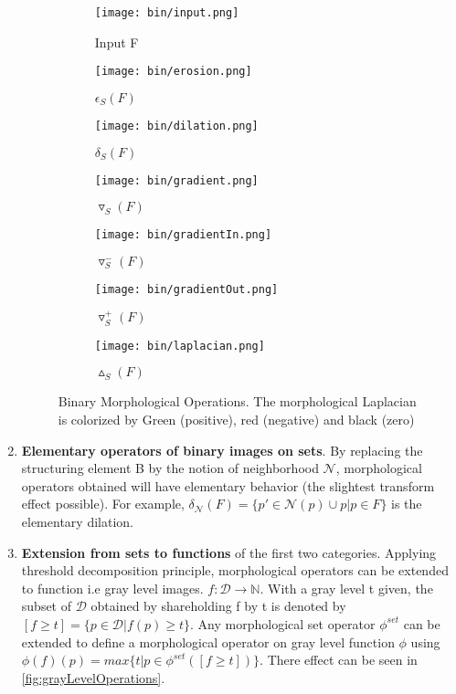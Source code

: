 \begin{enumerate}
\begin{figure}
	\begin{subfigure}{0.2\textwidth}
	 	\texttt{[image: bin/input.png]} \caption{Input F}\label{fig:inputbin} \end{subfigure}
	\begin{subfigure}{0.2\textwidth}
	 	\texttt{[image: bin/erosion.png]} \caption{$ \epsilon_S (F)$}\label{fig:erosionbin} \end{subfigure}
	\begin{subfigure}{0.2\textwidth}
		\texttt{[image: bin/dilation.png]} \caption{$ \delta_S (F)$}\label{fig:dilationbin} \end{subfigure}
	\centering
		
	\begin{subfigure}{0.2\textwidth}
		\texttt{[image: bin/gradient.png]} 
		\caption{$ \triangledown_S (F)$}\label{fig:gradientbin} \end{subfigure}
	\begin{subfigure}{0.2\textwidth}
		\texttt{[image: bin/gradientIn.png]} 
		\caption{$ \triangledown_S ^- (F)$}\label{fig:gradientInbin} \end{subfigure}		
	\begin{subfigure}{0.2\textwidth}	
		\texttt{[image: bin/gradientOut.png]} 
		\caption{$ \triangledown_S ^+ (F)$}\label{fig:gradientOutbin} \end{subfigure}
	\begin{subfigure}{0.2\textwidth}	
		\texttt{[image: bin/laplacian.png]} 
		\caption{$\vartriangle_S (F)$}\label{fig:laplacianbin} \end{subfigure}					
	\centering
	\caption[Example of \textit{morphological operations}] {Binary Morphological Operations. The morphological Laplacian is colorized by Green (positive), red (negative) and black (zero) }
	\label{fig:binOperations}
\end{figure}


\item \textbf{Elementary operators of binary images  on sets}. By replacing the structuring element B by the notion of neighborhood $\mathcal{N}$, morphological operators obtained will have elementary behavior (the slightest transform effect possible). For example, $ \delta_\mathcal{N} (F) = \lbrace p' \in \mathcal{N}(p) \cup p  \vert  p \in F \rbrace $ is the elementary dilation.

\item \textbf{Extension from sets to functions} of the first two categories. Applying threshold decomposition principle, morphological operators can be extended to function i.e gray level images. $ f: \mathcal{D} \rightarrow \mathbb{N}$. With a gray level t given, the subset of $ \mathcal{D} $ obtained by shareholding f by t is denoted by $[f \geq t] = \lbrace p \in \mathcal{D} \vert f(p) \geq t \rbrace $. Any morphological set operator $\phi^{set}$ can be extended to define a morphological operator on gray level function $\phi$ using $ \phi(f)(p) = max \lbrace t \vert p \in \phi^{set}([f \geq t]) \rbrace $. There effect can be seen in \ref{fig:grayLevelOperations}.


\end{enumerate}

